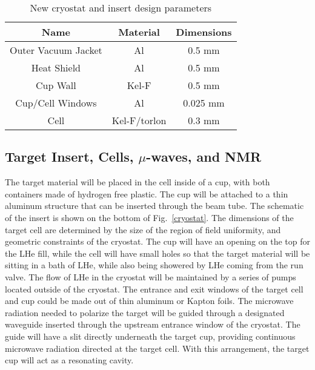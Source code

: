 \begin{table}[hbt]
\begin{center}
\begin{tabular}{|ccc|} \hline
Name   & Material  & Dimensions  \\
\hline 
Outer Vacuum Jacket & Al & 0.5 mm \\
\hline
Heat Shield & Al & 0.5 mm \\
\hline
Cup Wall & Kel-F & 0.5 mm\\
\hline
Cup/Cell Windows & Al& 0.025 mm \\
\hline
Cell & Kel-F/torlon & 0.3 mm\\
\hline
\end{tabular}
\end{center}
\caption{New cryostat and insert design parameters}
\label{fridge}
\end{table} 
 
\clearpage

\subsection{Target Insert, Cells, $\mu$-waves, and NMR}

 The target material will be placed in the cell inside of a cup, with both 
containers made of hydrogen free plastic. The cup will be attached to a thin 
aluminum structure that can be inserted through the beam tube. The schematic 
of the insert is shown on the bottom of Fig.~\ref{cryostat}.  The dimensions 
of the target cell are determined by the size of the region of field 
uniformity, and geometric constraints of the cryostat. The cup will have an 
opening on the top for the LHe fill, while the cell will have small holes so 
that the target material will be sitting in a bath of LHe, while also being 
showered by LHe coming from the run valve. The flow of LHe in the cryostat 
will be maintained by a series of pumps located outside of the cryostat. The 
entrance and exit windows of the target cell and cup could be made out of 
thin aluminum or Kapton foils. The microwave radiation needed to polarize 
the target will be guided through a designated waveguide inserted through the 
upstream entrance window of the cryostat.  The guide will have a slit directly 
underneath the target cup, providing continuous microwave radiation directed 
at the  target cell. With this arrangement, the target cup will act as a 
resonating cavity.     

